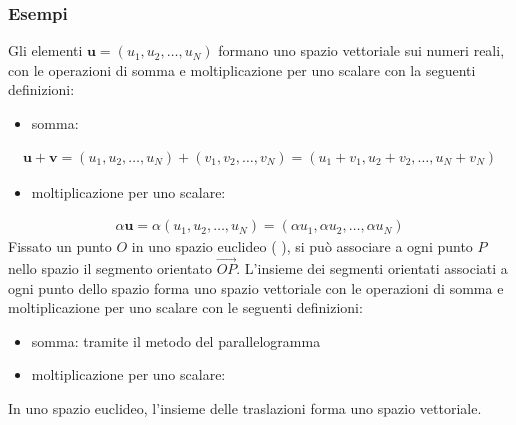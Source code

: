 \documentclass[letterpaper,10pt,english]{jupyterBook}
\begin{document}
\subsubsection{Esempi}
\label{\detokenize{ch/algebra/vector-algebra-def:esempi}}\label{\detokenize{ch/algebra/vector-algebra-def:math-hs-algebra-vector-def-examples}}
\sphinxAtStartPar
{}
Gli elementi \(\mathbf{u} = (u_1, u_2, \dots, u_N)\) formano uno spazio vettoriale sui numeri reali, con le operazioni di somma e moltiplicazione per uno scalare con la seguenti definizioni:
\begin{itemize}
\item {} 
\sphinxAtStartPar
somma:

\end{itemize}
\begin{equation*}
\begin{split}
  \mathbf{u} + \mathbf{v} = (u_1, u_2, \dots, u_N) + (v_1, v_2, \dots, v_N) = (u_1+v_1, u_2+v_2, \dots, u_N+v_N)
\end{split}
\end{equation*}\begin{itemize}
\item {} 
\sphinxAtStartPar
moltiplicazione per uno scalare:

\end{itemize}
\begin{equation*}
\begin{split}
  \alpha \mathbf{u}       = \alpha (u_1, u_2, \dots, u_N)                   = (\alpha u_1, \alpha u_2, \dots, \alpha u_N)
\end{split}
\end{equation*}
\sphinxAtStartPar
{}
Fissato un punto \(O\) in uno spazio euclideo ( ), si può associare a ogni punto \(P\) nello spazio il segmento orientato \(\overrightarrow{OP}\). L’insieme dei segmenti orientati associati a ogni punto dello spazio forma uno spazio vettoriale con le operazioni di somma e moltiplicazione per uno scalare con le seguenti definizioni:
\begin{itemize}
\item {} 
\sphinxAtStartPar
somma: tramite il metodo del parallelogramma 

\item {} 
\sphinxAtStartPar
moltiplicazione per uno scalare: 

\end{itemize}
\label{\detokenize{ch/algebra/vector-algebra-def:math-hs-algebra-vector-def-example-translations}}
\sphinxAtStartPar
{} In uno spazio euclideo, l’insieme delle traslazioni forma uno spazio vettoriale.
\end{document}
